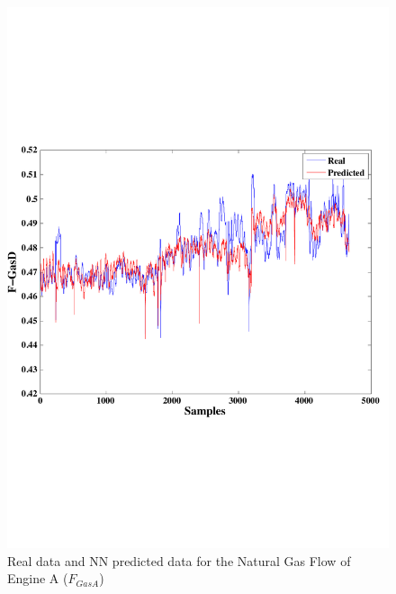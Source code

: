 \begin{figure}
\centering
\includegraphics[width=1\textwidth]{ANNengineD.pdf}
\caption{Real data and NN predicted data for the Natural Gas Flow  of Engine A ($F_{GasA}$) }
\label{FengineA}
\end{figure}


